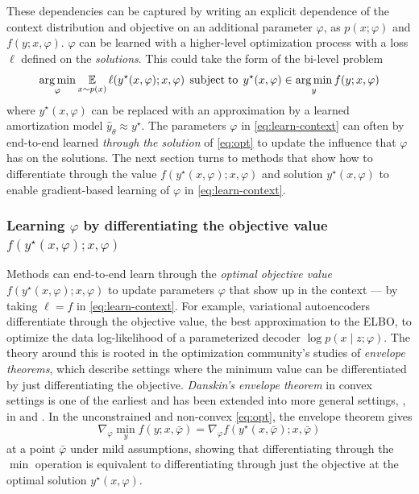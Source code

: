 These dependencies can be captured by writing an explicit
dependence of the context distribution and objective
on an additional parameter $\varphi$, \ie as $p(x; \varphi)$
and $f(y; x, \varphi)$.
$\varphi$ can be learned with a higher-level optimization
process with a loss $\ell$ defined on the \emph{solutions}.
This could take the form of the bi-level problem
\begin{equation}
  \operatorname*{arg\,min}_{\varphi} \operatorname*{\mathbb{E}}_{x\sim p(x)} \ell(y^\star(x, \varphi); x, \varphi)\;
  \operatorname*{subject\;to}\; y^\star(x, \varphi)\in\operatorname*{arg\,min}_y f(y; x, \varphi)
\label{eq:learn-context}
\end{equation}
where $y^\star(x, \varphi)$ can be replaced with an approximation
by a learned amortization model $\hat y_\theta \approx y^\star$.
The parameters $\varphi$ in \cref{eq:learn-context} can
often by end-to-end learned \emph{through the solution} of
\cref{eq:opt} to update the influence that $\varphi$
has on the solutions.
The next section turns to methods that show how to differentiate
through the value $f(y^\star(x, \varphi); x, \varphi)$ and solution
$y^\star(x, \varphi)$ to enable gradient-based learning of
$\varphi$ in \cref{eq:learn-context}.

\subsubsection{Learning $\varphi$ by differentiating
  the objective value $f(y^\star(x, \varphi); x, \varphi)$}
Methods can end-to-end learn through the \emph{optimal objective value}
$f(y^\star(x, \varphi); x, \varphi)$ to update parameters $\varphi$
that show up in the context --- \ie by taking $\ell=f$ in \cref{eq:learn-context}.
For example, variational autoencoders differentiate through
the objective value, \ie the best approximation to the ELBO,
to optimize the data log-likelihood of a parameterized
decoder $\log p(x\mid z; \varphi)$.
The theory around this is rooted in the optimization
community's studies of \emph{envelope theorems},
which describe settings where the minimum value
can be differentiated by just differentiating
the objective.
\emph{Danskin's envelope theorem} \citep{danskin1966theory}
in convex settings is one of the earliest and has been
extended into more general settings, \eg, in
\citep[Prop. A.22]{bertsekas1971control}
and \cite{carter2001foundations,milgrom2002envelope,bonnans2013perturbation}.
In the unconstrained and non-convex \cref{eq:opt},
the envelope theorem gives
\begin{equation}
  \nabla_\varphi \min_y f(y; x, \bar\varphi) = \nabla_\varphi f(y^\star(x, \bar\varphi); x, \bar\varphi)
  \label{eq:envelope}
\end{equation}
at a point $\bar\varphi$ under mild assumptions, showing
that differentiating through the $\min$ operation is equivalent to differentiating
through just the objective at the optimal solution $y^\star(x, \varphi)$.

